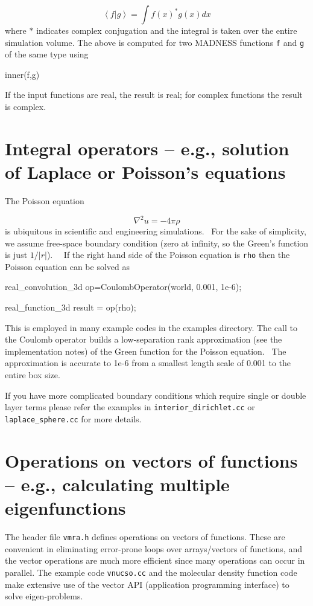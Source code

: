 \documentclass[letterpaper]{article}
\begin{document}
\begin{equation}
\left\langle f\left|g\right.\right\rangle =\int f(x)^{\text{*}}g(x)\mathit{dx}
\end{equation}
where  $\text{*}$ indicates complex conjugation and the integral is taken over the entire simulation volume. The above
is computed for two MADNESS functions \texttt{f} and \texttt{g} of the same type using

{\ttfamily
inner(f,g)}

If the input functions are real, the result is real; for complex functions the result is complex.

\section{Integral operators -- e.g., solution of Laplace or Poisson's equations}
The Poisson equation

\begin{equation*}
\nabla ^{2}u=-4\pi \rho 
\end{equation*}
is ubiquitous in scientific and engineering simulations. \ For the sake of simplicity, we assume free-space boundary
condition (zero at infinity, so the Green's function is just  $1/\left|r\right|$). \ \ If the right hand side of the
Poisson equation is \texttt{rho} then the Poisson equation can be solved as

{\ttfamily
real\_convolution\_3d op=CoulombOperator(world, 0.001, 1e-6);}

{\ttfamily
real\_function\_3d result = op(rho);}

This is employed in many example codes in the examples directory. The call to the Coulomb operator builds a
low-separation rank approximation (see the implementation notes) of the Green function for the Poisson equation. \ The
approximation is accurate to 1e-6 from a smallest length scale of 0.001 to the entire box size.

If you have more complicated boundary conditions which require single or double layer terms please refer the examples in
\texttt{interior\_dirichlet.cc} or \texttt{laplace\_sphere.cc} for more details.

\section{Operations on vectors of functions -- e.g., calculating multiple eigenfunctions}
The header file \texttt{vmra.h} defines operations on vectors of functions. These are convenient in eliminating
error-prone loops over arrays/vectors of functions, and the vector operations are much more efficient since many
operations can occur in parallel. The example code \texttt{vnucso.cc} and the molecular density function code make
extensive use of the vector API (application programming interface) to solve eigen-problems.
\end{document}
